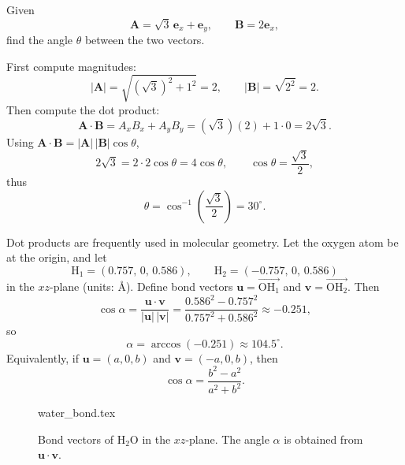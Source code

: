 \begin{example}
Given
\begin{equation}
\mathbf{A}=\sqrt{3}\,\mathbf{e}_x+\mathbf{e}_y,
\qquad
\mathbf{B}=2\mathbf{e}_x,
\end{equation}
find the angle $\theta$ between the two vectors.

First compute magnitudes:
\begin{equation}
|\mathbf{A}|=\sqrt{(\sqrt{3})^2+1^2}=2,
\qquad
|\mathbf{B}|=\sqrt{2^2}=2.
\end{equation}
Then compute the dot product:
\begin{equation}
\mathbf{A}\cdot\mathbf{B}=A_xB_x+A_yB_y=(\sqrt{3})(2)+1\cdot 0=2\sqrt{3}.
\end{equation}
Using $\mathbf{A}\cdot\mathbf{B}=|\mathbf{A}|\,|\mathbf{B}|\cos\theta$,
\begin{equation}
2\sqrt{3}=2\cdot 2\cos\theta=4\cos\theta,
\qquad
\cos\theta=\frac{\sqrt{3}}{2},
\end{equation}
thus
\begin{equation}
\theta=\cos^{-1}\!\left(\frac{\sqrt{3}}{2}\right)=30^\circ.
\end{equation}
\end{example}

\begin{example}
Dot products are frequently used in molecular geometry. Let the oxygen atom be at the origin, and let
\begin{equation}
\mathrm{H}_1=(0.757,\,0,\,0.586),
\qquad
\mathrm{H}_2=(-0.757,\,0,\,0.586)
\end{equation}
in the $xz$-plane (units: \AA). Define bond vectors $\mathbf{u}=\overrightarrow{\mathrm{OH}_1}$ and $\mathbf{v}=\overrightarrow{\mathrm{OH}_2}$. Then
\begin{equation}
\cos\alpha=\frac{\mathbf{u}\cdot\mathbf{v}}{|\mathbf{u}|\,|\mathbf{v}|}
=\frac{0.586^2-0.757^2}{0.757^2+0.586^2}\approx -0.251,
\end{equation}
so
\begin{equation}
\alpha=\arccos(-0.251)\approx 104.5^\circ.
\end{equation}
Equivalently, if $\mathbf{u}=(a,0,b)$ and $\mathbf{v}=(-a,0,b)$, then
\begin{equation}
\cos\alpha=\frac{b^2-a^2}{a^2+b^2}.
\end{equation}
\end{example}

\begin{figure}[htb]
    \centering
    {water_bond.tex}
    \caption{Bond vectors of $\mathrm{H}_2\mathrm{O}$ in the $xz$-plane. The angle $\alpha$ is obtained from $\mathbf{u}\cdot\mathbf{v}$.}
    \label{fig:water_bond}
\end{figure}

